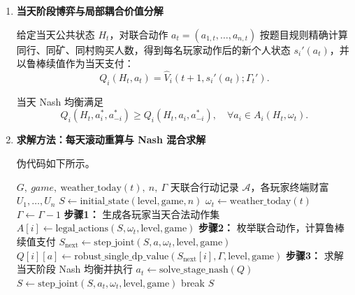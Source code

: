 \documentclass{cumcmthesis}
\numberwithin{equation}{section}
\numberwithin{figure}{section}
\numberwithin{table}{section}
\begin{document}
\begin{enumerate}
\hspace*{2em}该续值只评价个人未来，不需猜测其他玩家未来 30 天的完整轨迹；其他玩家真正产生的耦合将在之后每天重新进入"当前阶段博弈"。

    \item \textbf{当天阶段博弈与局部耦合价值分解}

\hspace*{2em}给定当天公共状态 $H_t$，对联合动作 $a_t=(a_{1,t},\dots,a_{n,t})$ 按题目规则精确计算同行、同矿、同村购买人数，得到每名玩家动作后的新个人状态 $s_i'(a_t)$，并以鲁棒续值作为当天支付：
\vspace{-10pt}
\begin{equation}
Q_i(H_t,a_t)=\hat{V}_i(t{+}1,s_i'(a_t);\Gamma_t').
\end{equation}

\hspace*{2em}当天 Nash 均衡满足
\vspace{-10pt}
\begin{equation}
Q_i(H_t,a_i^*,a_{-i}^*)\ge Q_i(H_t,a_i,a_{-i}^*),\quad \forall a_i\in A_i(H_t,\omega_t).
\end{equation}

    \item \textbf{求解方法：每天滚动重算与 Nash 混合求解}

\hspace*{2em}
伪代码如下所示。

\begin{algorithm}[H]
\caption{第六关每天滚动重算与 Nash 混合求解伪代码}
{\small
\begin{algorithmic}[1]
\Require $G,\ game,\ \text{weather\_today}(t),\ n,\ \Gamma$
 天联合行动记录 $\mathcal{A}$，各玩家终端财富 $U_1,\ldots,U_n$
\State $S\leftarrow\text{initial\_state}(\text{level},\text{game},n)$
    \State $\omega_t\leftarrow\text{weather\_today}(t)$
     \State $\Gamma\leftarrow\Gamma-1$ \EndIf
    \State \textbf{步骤1：} 生成各玩家当天合法动作集
        \State $A[i]\leftarrow\text{legal\_actions}(S,\omega_t,\text{level},\text{game})$
    \EndFor
    \State \textbf{步骤2：} 枚举联合动作，计算鲁棒续值支付
        \State $S_{\text{next}}\leftarrow\text{step\_joint}(S,a,\omega_t,\text{level},\text{game})$
            \State $Q[i][a]\leftarrow\text{robust\_single\_dp\_value}(S_{\text{next}}[i],\Gamma,\text{level},\text{game})$
        \EndFor
    \EndFor
    \State \textbf{步骤3：} 求解当天阶段 Nash 均衡并执行
    \State $a_t\leftarrow\text{solve\_stage\_nash}(Q)$
    \State $S\leftarrow\text{step\_joint}(S,a_t,\omega_t,\text{level},\text{game})$
     \State break \EndIf
\EndFor
\State \Return $S$
\end{algorithmic}
}
\label{alg:q32_rolling_nash}
\end{algorithm}


\end{enumerate}
\end{document}
